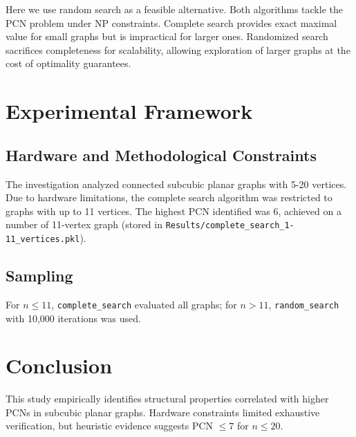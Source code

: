 \documentclass[12pt,a4paper]{amsart}
\theoremstyle{definition}
\theoremstyle{plain}
\begin{document}
Here we use random search as a feasible alternative. Both algorithms tackle the PCN problem under NP constraints. Complete search provides exact maximal value for small graphs but is impractical for larger ones. Randomized search sacrifices completeness for scalability, allowing exploration of larger graphs at the cost of optimality guarantees. 

\section{Experimental Framework}
\subsection{Hardware and Methodological Constraints}
The investigation analyzed connected subcubic planar graphs with 5-20 vertices. Due to hardware limitations, the complete search algorithm was restricted to graphs with up to 11 vertices. The highest PCN identified was 6, achieved on a number of 11-vertex graph (stored in \texttt{Results/complete\_search\_1-11\_vertices.pkl}).

\subsection{Sampling}
For $n \leq 11$, \texttt{complete\_search} evaluated all graphs; for $n > 11$, \texttt{random\_search} with 10,000 iterations was used. 

\section{Conclusion}
This study empirically identifies structural properties correlated with higher PCNs in subcubic planar graphs. 
Hardware constraints limited exhaustive verification, but heuristic evidence suggests PCN $\leq 7$ for $n \leq 20$. 
\end{document}
